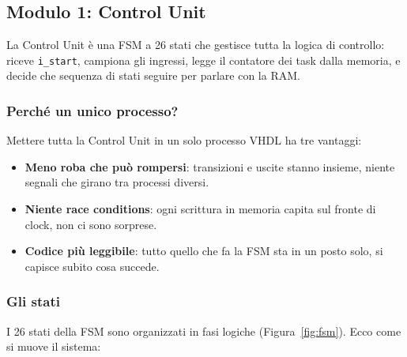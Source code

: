 \documentclass[a4paper,12pt]{article}
\begin{document}
\subsection{Modulo 1: Control Unit}

La Control Unit è una FSM a 26 stati che gestisce tutta la logica di controllo: riceve \texttt{i\_start}, campiona gli ingressi, legge il contatore dei task dalla memoria, e decide che sequenza di stati seguire per parlare con la RAM.
\newpage
\subsubsection{Perché un unico processo?}

Mettere tutta la Control Unit in un solo processo VHDL ha tre vantaggi:

\begin{itemize}
    \item \textbf{Meno roba che può rompersi}: transizioni e uscite stanno insieme, niente segnali che girano tra processi diversi.
    \item \textbf{Niente race conditions}: ogni scrittura in memoria capita sul fronte di clock, non ci sono sorprese.
    \item \textbf{Codice più leggibile}: tutto quello che fa la FSM sta in un posto solo, si capisce subito cosa succede.
\end{itemize}

\subsubsection{Gli stati}

I 26 stati della FSM sono organizzati in fasi logiche (Figura~\ref{fig:fsm}). Ecco come si muove il sistema:
\end{document}

